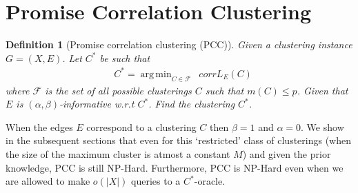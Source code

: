 \documentclass[12pt]{article}
\newtheorem{definition}[theorem]{Definition}
\newcommand{\mc}{\mathcal}
\DeclareMathOperator*{\argmin}{arg\,min}
\begin{document}
\section{Promise Correlation Clustering}
\label{section:PCC}

\begin{definition}[Promise correlation clustering (PCC)]
\label{defn:promiseCorrClustering}
Given a clustering instance $G = (X, E)$. Let $C^*$ be such that
\begin{align}
  &C^* = \argmin_{C \in \mc F} \enspace corrL_{E}(C) \label{eqn:promiseCorrLoss}
\end{align}
where $\mc F$ is the set of all possible clusterings $C$ such that $m(C) \le p$. Given that $E$ is $(\alpha, \beta)$-informative w.r.t $C^*$. Find the clustering $C^*$. 
\end{definition}
When the edges $E$ correspond to a clustering $C$ then $\beta = 1$ and $\alpha = 0$. We show in the subsequent sections that even for this `restricted' class of clusterings (when the size of the maximum cluster is atmost a constant $M$) and given the prior knowledge, PCC is still NP-Hard. Furthermore, PCC is NP-Hard even when we are allowed to make $o(|X|)$ queries to a $C^*$-oracle. 
\end{document}
